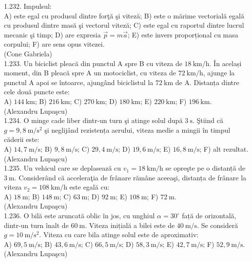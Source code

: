 {1.232. Impulsul:\\ A) este egal cu produsul dintre forţă şi viteză; B) este o mărime vectorială egală cu produsul dintre masă şi vectorul viteză; C) este egal cu raportul dintre lucrul mecanic şi timp; D) are expresia $\vec{p}=m \vec{a}$; E) este invers proporțional cu masa corpului; F) are sens opus vitezei.\\ (Cone Gabriela)\\

1.233. Un biciclist pleacă din punctul A spre B cu viteza de $18 \mathrm{~km} / \mathrm{h}$. În același moment, din B pleacă spre A un motociclist, cu viteza de $72 \mathrm{~km} / \mathrm{h}$, ajunge la punctul A apoi se întoarce, ajungând biciclistul la $72 \mathrm{~km}$ de A. Distanța dintre cele două puncte este:\\ A) $144 \mathrm{~km}$; B) $216 \mathrm{~km}$; C) $270 \mathrm{~km}$; D) $180 \mathrm{~km}$; E) $220 \mathrm{~km}$; F) $196 \mathrm{~km}$.\\ (Alexandru Lupaşcu)\\

1.234. O minge cade liber dintr-un turn şi atinge solul după $3 \mathrm{~s}$. Ştiind că $g=9,8 \mathrm{~m} / \mathrm{s}^{2}$ şi neglijând rezistența aerului, viteza medie a mingii în timpul căderii este:\\ A) $14,7 \mathrm{~m} / \mathrm{s}$; B) $9,8 \mathrm{~m} / \mathrm{s}$; C) $29,4 \mathrm{~m} / \mathrm{s}$; D) $19,6 \mathrm{~m} / \mathrm{s}$; E) $16,8 \mathrm{~m} / \mathrm{s}$; F) alt rezultat.\\ (Alexandru Lupaşcu)\\

1.235. Un vehicul care se deplasează cu $v_{1}=18 \mathrm{~km} / \mathrm{h}$ se opreşte pe o distanță de $3 \mathrm{~m}$. Considerând că acceleraţia de frânare rămâne aceeaşi, distanța de frânare la viteza $v_{2}=108 \mathrm{~km} / \mathrm{h}$ este egală cu:\\ A) $18 \mathrm{~m}$; B) $148 \mathrm{~m}$; C) $63 \mathrm{~m}$; D) $92 \mathrm{~m}$; E) $108 \mathrm{~m}$; F) $72 \mathrm{~m}$.\\ (Alexandru Lupaşcu)\\

1.236. O bilă este aruncată oblic în jos, cu unghiul $\alpha=30^{\circ}$ față de orizontală, dintr-un turn înalt de $60 \mathrm{~m}$. Viteza inițială a bilei este de $40 \mathrm{~m} / \mathrm{s}$. Se consideră $g=10 \mathrm{~m} / \mathrm{s}^{2}$. Viteza cu care bila atinge solul este de aproximativ:\\ A) $69,5 \mathrm{~m} / \mathrm{s}$; B) $43,6 \mathrm{~m} / \mathrm{s}$; C) $66,5 \mathrm{~m} / \mathrm{s}$; D) $58,3 \mathrm{~m} / \mathrm{s}$; E) $42,7 \mathrm{~m} / \mathrm{s}$; F) $52,9 \mathrm{~m} / \mathrm{s}$.\\ (Alexandru Lupaşcu)\\

}
